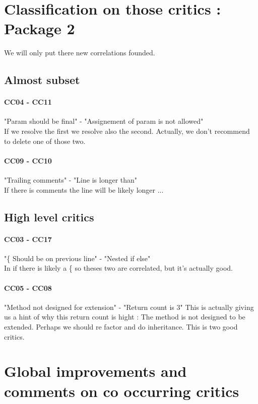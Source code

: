 \documentclass{article}
\begin{document}
\section{Classification on those critics : Package 2}
We will only put there new correlations founded.

\subsection{Almost subset}
\paragraph{CC04 - CC11}
 "Param should be final" - "Assignement of param is not allowed"  \\
If we resolve the first we resolve also the second. Actually, we don't recommend to delete one of those two.

\paragraph{CC09 - CC10}
 "Trailing comments" - "Line is longer than" \\
If there is comments the line will be likely longer ...

\subsection{High level critics}
\paragraph{CC03 - CC17} 
"\{ Should be on previous line" -  "Nested if else" \\
In if there is likely a \{ so theses two are correlated, but it's actually good.

\paragraph{CC05 - CC08} 
 "Method not designed for extension" - "Return count is 3"
This is actually giving us a hint of why this return count is hight : The method is not designed to be extended. Perhaps we should re factor and do inheritance. This is two good critics.


\section{Global improvements and comments on co occurring critics} 
\end{document}
